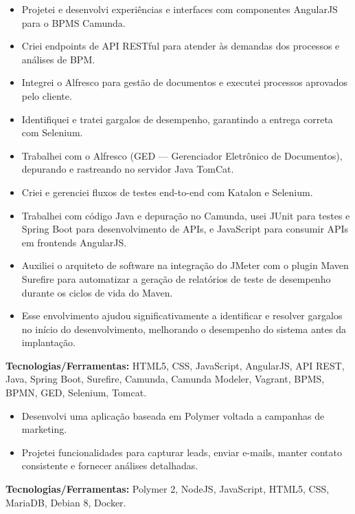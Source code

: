 \documentclass[10pt,a4paper]{altacv}
\begin{document}
\begin{itemize}
    \setlength{\itemindent}{0.5em}
    \item[--] Projetei e desenvolvi experiências e interfaces com componentes AngularJS para o BPMS Camunda.
    \item[--] Criei endpoints de API RESTful para atender às demandas dos processos e análises de BPM.
    \item[--] Integrei o Alfresco para gestão de documentos e executei processos aprovados pelo cliente.
    \item[--] Identifiquei e tratei gargalos de desempenho, garantindo a entrega correta com Selenium.
    \item[--] Trabalhei com o Alfresco (GED — Gerenciador Eletrônico de Documentos), depurando e rastreando no servidor Java TomCat.
    \item[--] Criei e gerenciei fluxos de testes end-to-end com Katalon e Selenium.
    \item[--] Trabalhei com código Java e depuração no Camunda, usei JUnit para testes e Spring Boot para desenvolvimento de APIs, e JavaScript para consumir APIs em frontends AngularJS.
    \item[--] Auxiliei o arquiteto de software na integração do JMeter com o plugin Maven Surefire para automatizar a geração de relatórios de teste de desempenho durante os ciclos de vida do Maven.
    \item[--] Esse envolvimento ajudou significativamente a identificar e resolver gargalos no início do desenvolvimento, melhorando o desempenho do sistema antes da implantação.
\end{itemize}
\textbf{Tecnologias/Ferramentas:} HTML5, CSS, JavaScript, AngularJS, API REST, Java, Spring Boot, Surefire, Camunda, Camunda Modeler, Vagrant, BPMS, BPMN, GED, Selenium, Tomcat.
\vspace{5mm}

\begin{itemize}
    \setlength{\itemindent}{0.5em}
    \item[--] Desenvolvi uma aplicação baseada em Polymer voltada a campanhas de marketing.
    \item[--] Projetei funcionalidades para capturar leads, enviar e-mails, manter contato consistente e fornecer análises detalhadas.
\end{itemize}
\textbf{Tecnologias/Ferramentas:} Polymer 2, NodeJS, JavaScript, HTML5, CSS, MariaDB, Debian 8, Docker.
\vspace{5mm}
\end{document}
